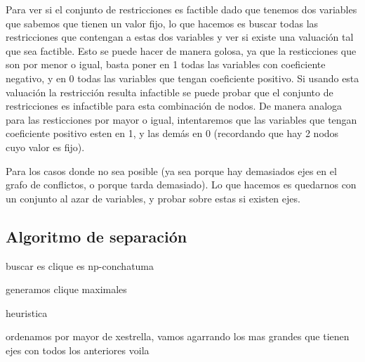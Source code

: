 Para ver si el conjunto de restricciones es factible dado que tenemos dos variables que sabemos que tienen un valor fijo, lo que hacemos es buscar
todas las restricciones que contengan a estas dos variables y ver si existe una valuaci\'on tal que sea factible. Esto se puede hacer de manera
golosa, ya que la resticciones que son por menor o igual, basta poner en 1 todas las variables con coeficiente negativo, y en 0 todas las variables que tengan coeficiente positivo. Si usando
esta valuaci\'on la restricci\'on resulta infactible se puede probar que el conjunto de restricciones es infactible para esta combinaci\'on de nodos. De manera analoga para las resticciones
 por mayor o igual, intentaremos que las variables que tengan coeficiente positivo esten en 1, y las dem\'as en 0 (recordando que hay 2 nodos cuyo valor es fijo).

Para los casos donde no sea posible (ya sea porque hay demasiados ejes en el grafo de conflictos, o porque tarda demasiado). Lo que hacemos es quedarnos
con un conjunto al azar de variables, y probar sobre estas si existen ejes.

\bigskip
\subsection{Algoritmo de separaci\'on}


buscar es clique es np-conchatuma

generamos clique maximales

heuristica

ordenamos por mayor de xestrella, vamos agarrando los mas grandes que tienen ejes con todos los anteriores voila
